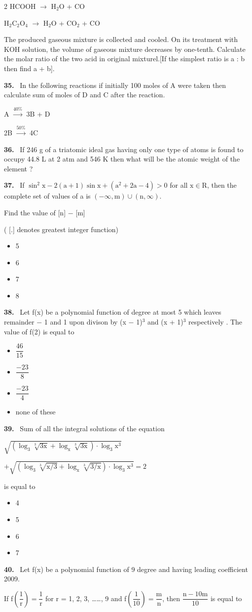 \documentclass[10pt]{extarticle}
\newcommand{\partsec}[2]{\par\medskip\noindent{\large\bfseries PART-#1: #2}\par\smallskip}
\newcommand{\qn}[1]{\par\smallskip\noindent\textbf{#1.}~}
\newenvironment{qoptions}{\begin{itemize}[leftmargin=1.8em,itemsep=1pt,topsep=2pt,label={}]}{\end{itemize}}
\newcommand{\opt}[2]{\item[(#1)] #2}
\begin{document}
\begin{multicols}{2}
HCOOH $\longrightarrow$ H$_2$O + CO\par
H$_2$C$_2$O$_4$ $\longrightarrow$ H$_2$O + CO$_2$ + CO\par
The produced gaseous mixture is collected and cooled. On its treatment with KOH solution, the volume of gaseous mixture decreases by one-tenth. Calculate the molar ratio of the two acid in original mixturel.[If the simplest ratio is a : b then find a + b].
\qn{35} In the following reactions if initially 100 moles of A were taken then calculate sum of moles of D and C after the reaction.\par
A $\xrightarrow{40\%}$ 3B + D\par
2B $\xrightarrow{50\%}$ 4C
\qn{36} If 246 g of a triatomic ideal gas having only one type of atoms is found to occupy 44.8 L at 2 atm and 546 K then what will be the atomic weight of the element ?
\raggedcolumns
\partsec{3}{MATHEMATICS}
\qn{37} If $\sin^2\mathrm x-2(\mathrm a+1)\sin\mathrm x+\left(\mathrm a^2+2\mathrm a-4\right)>0$ for all $\mathrm x\in\mathrm R$, then the complete set of values of a is $(-\infty,\mathrm m)\cup(\mathrm n,\infty)$.\par
Find the value of [n] $-$ [m]\par
( [.] denotes greatest integer function)
\begin{qoptions}
\opt{A}{5}
\opt{B}{6}
\opt{C}{7}
\opt{D}{8}
\end{qoptions}
\qn{38} Let f(x) be a polynomial function of degree at most 5 which leaves remainder $-$ 1 and 1 upon divison by (x $-$ 1)$^3$ and (x + 1)$^3$ respectively . The value of f(2) is equal to
\begin{qoptions}
\opt{A}{$\dfrac{46}{15}$}
\opt{B}{$\dfrac{-23}8$}
\opt{C}{$\dfrac{-23}4$}
\opt{D}{none of these}
\end{qoptions}
\qn{39} Sum of all the integral solutions of the equation\par
{\footnotesize$\sqrt{\left(\log_3\sqrt[3]{3\mathrm x}+\log_\mathrm x\sqrt[3]{3\mathrm x}\right)\cdot\log_3\mathrm x^3}$\par $+\sqrt{\left(\log_3\sqrt[3]{\mathrm x/3}+\log_\mathrm x\sqrt[3]{3/\mathrm x}\right)\cdot\log_3\mathrm x^3}=2$}\par
is equal to
\begin{qoptions}
\opt{A}{4}
\opt{B}{5}
\opt{C}{6}
\opt{D}{7}
\end{qoptions}
\qn{40} Let f(x) be a polynomial function of 9 degree and having leading coefficient 2009.\par
If f$\left(\dfrac1{\mathrm r}\right)=\dfrac1{\mathrm r}$ for r = 1, 2, 3, \ldots\ldots, 9 and f$\left(\dfrac1{10}\right)=\dfrac{\mathrm m}{\mathrm n}$, then $\dfrac{\mathrm n-10\mathrm m}{10}$ is equal to\par

\end{multicols}
\end{document}
